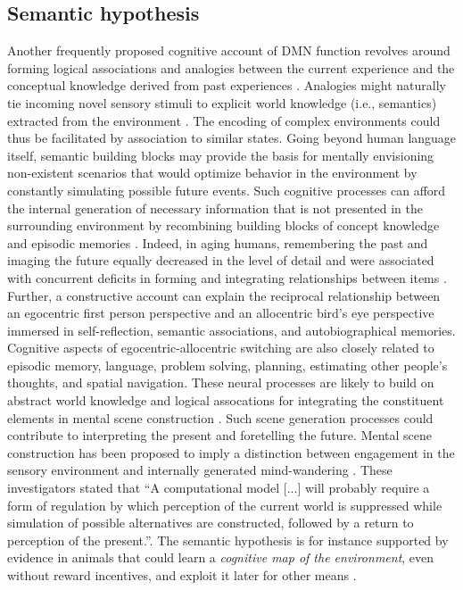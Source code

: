 \documentclass[10pt,letterpaper]{article}
\begin{document}
\subsection{Semantic hypothesis}
Another frequently proposed cognitive account of DMN function revolves
around forming logical associations and analogies between
the current experience and
the conceptual knowledge derived from past experiences
\citep{bar2007proactive, binder1999conceptual}.
Analogies might naturally tie incoming novel sensory stimuli to
explicit world knowledge (i.e., semantics) extracted from the environment
\citep{bar2009proactive}.
The encoding of complex environments could thus be facilitated
by association to similar states.
%
Going beyond human language itself,
semantic building blocks may provide the basis for
mentally envisioning non-existent scenarios
that would optimize behavior in the environment
by constantly simulating possible future events.
Such cognitive processes can afford
the internal generation of necessary information
that is not presented in the surrounding environment
by recombining building blocks of
concept knowledge and episodic memories
\citep{hassabis2009construction}.
Indeed, in aging humans, remembering the past and imaging the future
equally decreased in the level of detail and were associated with
concurrent deficits in forming and integrating relationships between
items \citep{addis2008age, spreng2006temporal}.
Further,
a constructive account can explain the reciprocal relationship
between an egocentric first person perspective and
an allocentric bird’s eye perspective immersed in
self-reflection, semantic associations, and autobiographical memories.
%
Cognitive aspects of egocentric-allocentric switching
are also closely related to episodic memory, language, problem solving,
planning, estimating other people's thoughts, and spatial navigation.
These neural processes are likely to
build on abstract world knowledge and logical assocations
for integrating the constituent elements in mental scene construction
\citep{schacter2007remembering}.
Such scene generation processes could contribute to interpreting the
present and foretelling the future.
Mental scene construction has been proposed
to imply a distinction between
engagement in the sensory environment
and internally generated mind-wandering
\citep{buckner2007self}.
These investigators stated that
``A computational model [...] will probably require a form of
regulation by which perception of the current world is suppressed
while simulation of possible alternatives are constructed,
followed by a return to perception of the present.''.
The semantic hypothesis is for instance supported by evidence in animals that
could learn a \textit{cognitive map of the environment},
even without reward incentives, and exploit it later
for other means \citep{tolman1948cognitive}.
\end{document}
